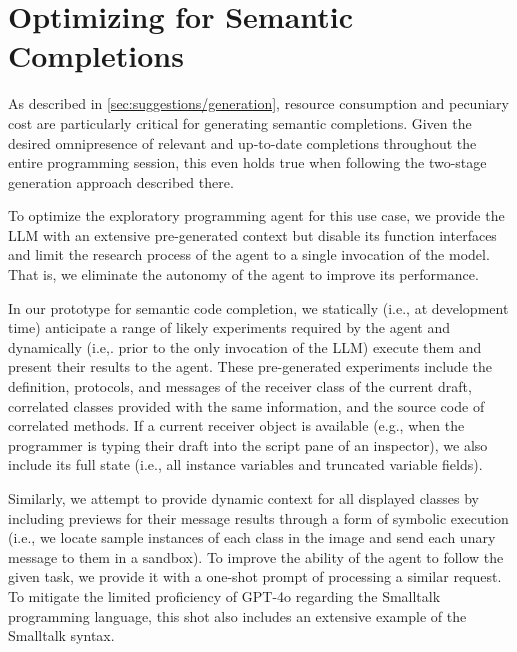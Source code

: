 
\section{Optimizing for Semantic Completions}
\label{sec:agent/completions}

As described in \cref{sec:suggestions/generation}, resource consumption and pecuniary cost are particularly critical for generating semantic completions.
Given the desired omnipresence of relevant and up-to-date completions throughout the entire programming session, this even holds true when following the two-stage generation approach described there.

To optimize the exploratory programming agent for this use case, we provide the LLM with an extensive pre-generated context but disable its function interfaces and limit the research process of the agent to a single invocation of the model.
That is, we eliminate the autonomy of the agent to improve its performance. %

In our prototype for semantic code completion, we statically (i.e., at development time) anticipate a range of likely experiments required by the agent and dynamically (i.e,. prior to the only invocation of the LLM) execute them and present their results to the agent.
These pre-generated experiments include the definition, protocols, and messages of the receiver class of the current draft, correlated classes provided with the same information, and the source code of correlated methods.
If a current receiver object is available (e.g., when the programmer is typing their draft into the script pane of an inspector), we also include its full state (i.e., all instance variables and truncated variable fields).

Similarly, we attempt to provide dynamic context for all displayed classes by including previews for their message results through a form of symbolic execution (i.e., we locate sample instances of each class in the image and send each unary message to them in a sandbox). %
To improve the ability of the agent to follow the given task, we provide it with a one-shot prompt of processing a similar request.
To mitigate the limited proficiency of GPT-4o regarding the Smalltalk programming language, this shot also includes an extensive example of the Smalltalk syntax.

